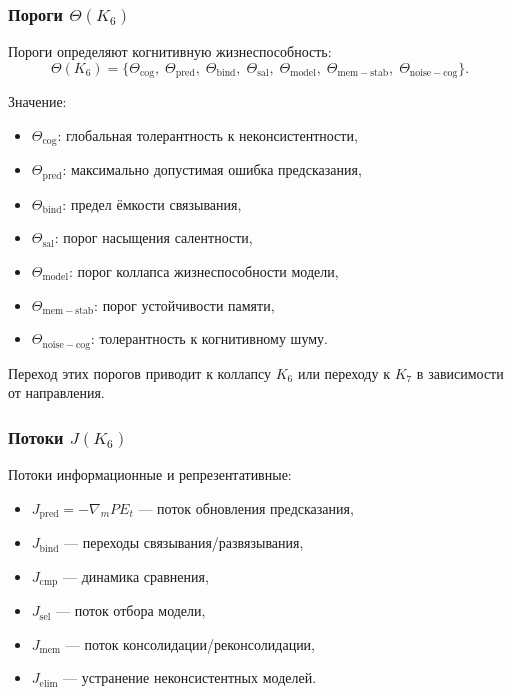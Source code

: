 \subsubsection{Пороги \texorpdfstring{$\Theta(K_6)$}{\Theta(K_6)}}

Пороги определяют когнитивную жизнеспособность:
\[
\Theta(K_6)=
\{\Theta_{\mathrm{cog}},\;
\Theta_{\mathrm{pred}},\;
\Theta_{\mathrm{bind}},\;
\Theta_{\mathrm{sal}},\;
\Theta_{\mathrm{model}},\;
\Theta_{\mathrm{mem-stab}},\;
\Theta_{\mathrm{noise-cog}}\}.
\]

Значение:
\begin{itemize}
    \item $\Theta_{\mathrm{cog}}$: глобальная толерантность к
          неконсистентности,
    \item $\Theta_{\mathrm{pred}}$: максимально допустимая ошибка
          предсказания,
    \item $\Theta_{\mathrm{bind}}$: предел ёмкости связывания,
    \item $\Theta_{\mathrm{sal}}$: порог насыщения салентности,
    \item $\Theta_{\mathrm{model}}$: порог коллапса жизнеспособности модели,
    \item $\Theta_{\mathrm{mem-stab}}$: порог устойчивости памяти,
    \item $\Theta_{\mathrm{noise-cog}}$: толерантность к когнитивному шуму.
\end{itemize}

Переход этих порогов приводит к коллапсу $K_6$ или переходу к $K_7$ в
зависимости от направления.

\subsubsection{Потоки \texorpdfstring{$J(K_6)$}{J(K_6)}}

Потоки информационные и репрезентативные:

\begin{itemize}
    \item $J_{\mathrm{pred}} = -\nabla_m PE_t$ — поток обновления
          предсказания,
    \item $J_{\mathrm{bind}}$ — переходы связывания/развязывания,
    \item $J_{\mathrm{cmp}}$ — динамика сравнения,
    \item $J_{\mathrm{sel}}$ — поток отбора модели,
    \item $J_{\mathrm{mem}}$ — поток консолидации/реконсолидации,
    \item $J_{\mathrm{elim}}$ — устранение неконсистентных моделей.
\end{itemize}

